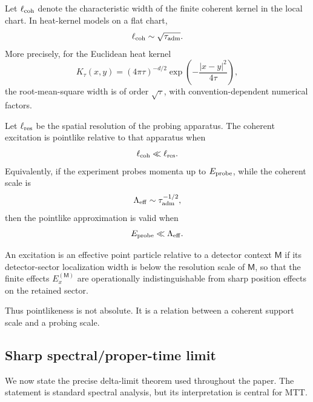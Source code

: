\documentclass[11pt]{article}
\newcommand{\ta}{\tau_{\mathrm{adm}}}
\newcommand{\Meas}{\mathsf M}
\begin{document}
Let \(\ell_{\rm coh}\) denote the characteristic width of the finite coherent kernel in the local
chart. In heat-kernel models on a flat chart,
\begin{equation}
  \ell_{\rm coh}\sim \sqrt{\ta}.
  \label{eq:ell-coh}
\end{equation}
More precisely, for the Euclidean heat kernel
\begin{equation}
  K_\tau(x,y)
  =
  (4\pi\tau)^{-d/2}
  \exp\left(-\frac{|x-y|^2}{4\tau}\right),
  \label{eq:flat-heat-kernel}
\end{equation}
the root-mean-square width is of order \(\sqrt{\tau}\), with convention-dependent numerical
factors.

Let \(\ell_{\rm res}\) be the spatial resolution of the probing apparatus. The coherent excitation
is pointlike relative to that apparatus when
\begin{equation}
  \ell_{\rm coh}\ll \ell_{\rm res}.
  \label{eq:pointlike-resolution}
\end{equation}
Equivalently, if the experiment probes momenta up to \(E_{\rm probe}\), while the coherent
scale is
\begin{equation}
  \Lambda_{\rm eff}\sim \ta^{-1/2},
\end{equation}
then the pointlike approximation is valid when
\begin{equation}
  E_{\rm probe}\ll \Lambda_{\rm eff}.
  \label{eq:pointlike-energy}
\end{equation}

\begin{definition}
\label{def:effective-point-particle}
An excitation is an effective point particle relative to a detector context \(\Meas\) if its
detector-sector localization width is below the resolution scale of \(\Meas\), so that the
finite effects \(E_x^{(\Meas)}\) are operationally indistinguishable from sharp position
effects on the retained sector.
\end{definition}

Thus pointlikeness is not absolute. It is a relation between a coherent support scale and a
probing scale.

\subsection{Sharp spectral/proper-time limit}
\label{subsec:sharp-limit}

We now state the precise delta-limit theorem used throughout the paper. The statement is
standard spectral analysis, but its interpretation is central for MTT.
\end{document}
